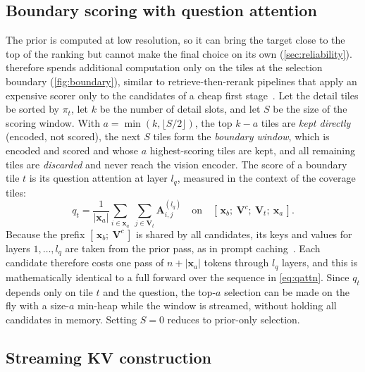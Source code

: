\subsection{Boundary scoring with question attention}
\label{sec:boundary}

The prior is computed at low resolution, so it can bring the target close to the top of the ranking but
cannot make the final choice on its own (\cref{sec:reliability}). \method therefore spends additional computation only on the tiles at the selection
boundary (\cref{fig:boundary}), similar to retrieve-then-rerank pipelines that apply an expensive scorer
only to the candidates of a cheap first stage~\cite{monobert}. Let the detail tiles be sorted by $\pi_t$, let $k$ be the number of
detail slots, and let $S$ be the size of the scoring window. With $a=\min(k,\lfloor S/2\rfloor)$, the top $k-a$ tiles are \emph{kept
directly} (encoded, not scored), the next $S$ tiles form the \emph{boundary window}, which is encoded and
scored and whose $a$ highest-scoring tiles are kept, and all remaining tiles are \emph{discarded} and never
reach the vision encoder.
The score of a boundary tile $t$ is its question attention at layer $l_q$, measured in the context of
the coverage tiles:
\begin{equation}
  q_t=\frac{1}{|\mathbf{x}_a|}\sum_{i\in\mathbf{x}_a}\ \sum_{j\in\mathbf{V}_t}
      \mathbf{A}^{(l_q)}_{i,j}
  \quad\text{on}\quad [\,\mathbf{x}_b;\ \mathbf{V}^{c};\ \mathbf{V}_t;\ \mathbf{x}_a\,].
  \label{eq:qattn}
\end{equation}
Because the prefix $[\,\mathbf{x}_b;\ \mathbf{V}^{c}\,]$ is shared by all candidates, its keys and values
for layers $1,\dots,l_q$ are taken from the prior pass, as in prompt caching~\cite{promptcache}. Each candidate therefore costs one pass of
$n+|\mathbf{x}_a|$ tokens through $l_q$ layers, and this is mathematically identical to a full forward
over the sequence in \cref{eq:qattn}. Since $q_t$ depends only on tile $t$ and the question, the top-$a$
selection can be made on the fly with a size-$a$ min-heap while the window is streamed, without holding
all candidates in memory. Setting $S=0$ reduces \method to prior-only selection.


\subsection{Streaming KV construction}
\label{sec:streaming}

